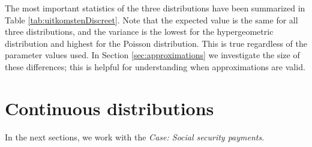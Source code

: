 The most important statistics of the three distributions have been summarized in Table \ref{tab:uitkomstenDiscreet}. Note that the expected value is the same for all three distributions, and the variance is the lowest for the hypergeometric distribution and highest for the Poisson distribution. This is true regardless of the parameter values used. In Section \ref{sec:approximations} we investigate the size of these differences; this is helpful for understanding when approximations are valid.


\section*{Continuous distributions} %
\label{sec:continuous_distributions}

In the next sections, we work with the \emph{Case: Social security payments}.

